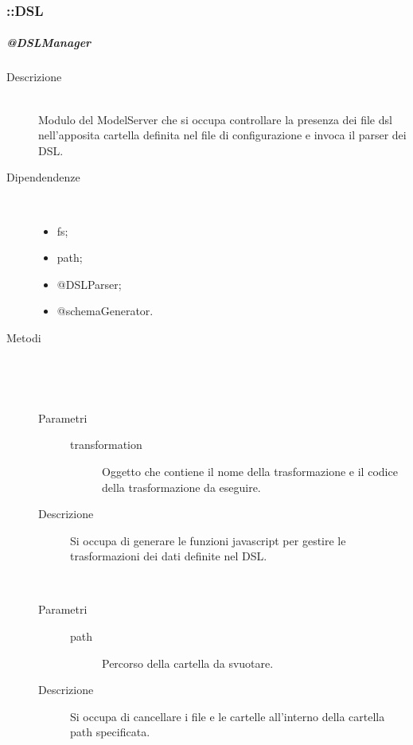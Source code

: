 \subsubsection{::DSL}
\subparagraph{@DSLManager}
\begin{description}
 \item[Descrizione] \hfill \\
  Modulo del ModelServer che si occupa controllare la presenza dei file dsl nell'apposita cartella definita nel file di configurazione e invoca il parser dei DSL.
 \item[Dipendendenze] \hfill \\
 \begin{itemize}
 \item{fs};
  \item{path};
  \item{@DSLParser};
  \item{@schemaGenerator}.
 \end{itemize} 
 \item[Metodi] \hfill \\
 \begin{mldescription}
 \mlitem[generateFunction] \hfill \\
  	\begin{description}
   		\item[Parametri] \hfill
   			\begin{description}
   				\item[transformation]
   				Oggetto che contiene il nome della trasformazione e il codice della trasformazione da eseguire.
   			\end{description}
   		\item[Descrizione]
   		Si occupa di generare le funzioni javascript per gestire le trasformazioni dei dati definite nel DSL.
   	\end{description}
 \mlitem[deleteFolderRecursive] \hfill \\
   	\begin{description}
    		\item[Parametri] \hfill
    			\begin{description}
    				\item[path]
    				Percorso della cartella da svuotare.
    			\end{description}
    		\item[Descrizione]
    		Si occupa di cancellare i file e le cartelle all'interno della cartella path specificata.
    	\end{description}
 \mlitem[checkDSL] \hfill \\  	

\end{mldescription}
\end{description}

